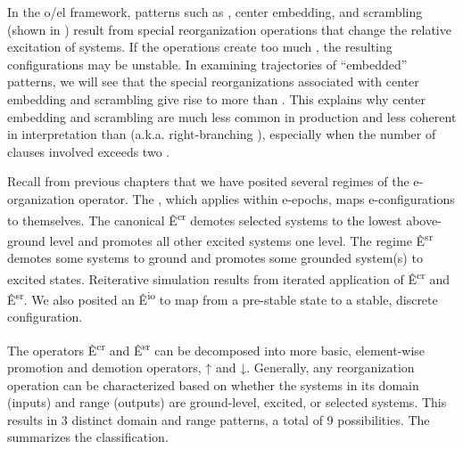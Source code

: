   In the o/el framework, patterns such as , center embedding, and scrambling (shown in {}) result from special reorganization operations that change the relative excitation of systems. If the operations create too much , the resulting configurations may be unstable. In examining trajectories of “embedded” patterns, we will see that the special reorganizations associated with center embedding and scrambling give rise to more  than . This explains why center embedding and scrambling are much less common in production and less coherent in interpretation than  (a.k.a. right-branching ), especially when the number of clauses involved exceeds two \citep{ChristiansenChater1999}. 

  Recall from previous chapters that we have posited several regimes of the e-organization operator. The , which applies within e-epochs, maps e-con\-fig\-u\-ra\-tions to themselves. The canonical  Ê\textsuperscript{cr} demotes selected systems to the lowest above-ground level and promotes all other excited systems one level. The  regime Ê\textsuperscript{sr} demotes some systems to ground and promotes some grounded system(s) to excited states. Reiterative simulation results from iterated application of Ê\textsuperscript{cr} and Ê\textsuperscript{sr}. We also posited an  Ê\textsuperscript{io} to map from a pre-stable state to a stable, discrete configuration.

  The operators Ê\textsuperscript{cr} and Ê\textsuperscript{sr} can be decomposed into more basic, element-wise promotion and demotion operators, ↑ and ↓. Generally, any reorganization operation can be characterized based on whether the systems in its domain (inputs) and range (outputs) are ground-level, excited, or selected systems. This results in 3 distinct domain and range patterns, a total of 9 possibilities. The {} summarizes the classification.

